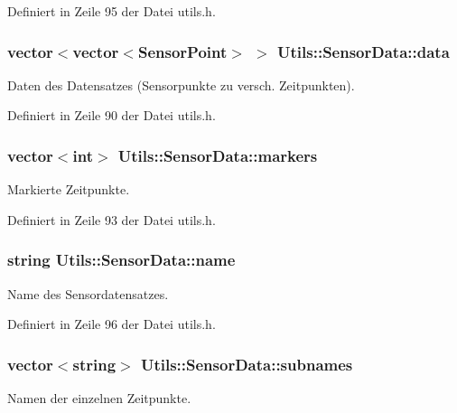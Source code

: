 Definiert in Zeile 95 der Datei utils.\-h.

\hypertarget{structUtils_1_1SensorData_ae94e7645dc0b6adfd21571b0abd5e309}{
\subsubsection[{data}]{\setlength{\rightskip}{0pt plus 5cm}vector$<$vector$<${\bf Sensor\-Point}$>$ $>$ Utils\-::\-Sensor\-Data\-::data}}\label{structUtils_1_1SensorData_ae94e7645dc0b6adfd21571b0abd5e309}
Daten des Datensatzes (Sensorpunkte zu versch. Zeitpunkten). 

Definiert in Zeile 90 der Datei utils.\-h.

\hypertarget{structUtils_1_1SensorData_ac2d7e037f39affd6ad9d4aa29ed579da}{
\subsubsection[{markers}]{\setlength{\rightskip}{0pt plus 5cm}vector$<$int$>$ Utils\-::\-Sensor\-Data\-::markers}}\label{structUtils_1_1SensorData_ac2d7e037f39affd6ad9d4aa29ed579da}
Markierte Zeitpunkte. 

Definiert in Zeile 93 der Datei utils.\-h.

\hypertarget{structUtils_1_1SensorData_a52474d0fe0dce0d3ee73c007a150a507}{
\subsubsection[{name}]{\setlength{\rightskip}{0pt plus 5cm}string Utils\-::\-Sensor\-Data\-::name}}\label{structUtils_1_1SensorData_a52474d0fe0dce0d3ee73c007a150a507}
Name des Sensordatensatzes. 

Definiert in Zeile 96 der Datei utils.\-h.

\hypertarget{structUtils_1_1SensorData_ad5875ab7e8ebdc9dc41a7b9ef1c063ba}{
\subsubsection[{subnames}]{\setlength{\rightskip}{0pt plus 5cm}vector$<$string$>$ Utils\-::\-Sensor\-Data\-::subnames}}\label{structUtils_1_1SensorData_ad5875ab7e8ebdc9dc41a7b9ef1c063ba}
Namen der einzelnen Zeitpunkte. 

